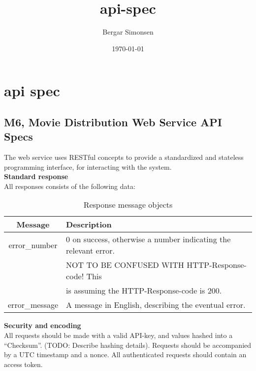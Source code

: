 \documentclass[11pt]{article}
\title{api-spec}
\author{Bergar Simonsen}
\date{\today}
\begin{document}
\maketitle

\setcounter{tocdepth}{3}
\tableofcontents
\vspace*{1cm}
\section{api spec}
\label{sec-1}
\subsection{M6, Movie Distribution Web Service API Specs}
\label{sec-1-1}

The web service uses RESTful concepts to provide a standardized and stateless programming interface, for interacting with the system. \\

\textbf{Standard response} \\
All responses consists of the following data:

\begin{table}[H]
\caption{Response message objects}
\begin{center}
\begin{tabular}{|c|l|}
\hline
 Message                     &  Description                                               \\
\hline
 error\_number   &  0 on success, otherwise a number indicating the relevant error.  \\
                             &  NOT TO BE CONFUSED WITH HTTP-Response-code! This   \\
                             &  is assuming the HTTP-Response-code is 200.                \\
\hline
 error\_message  &  A message in English, describing the eventual error.      \\
\hline
\end{tabular}
\end{center}
\end{table}



\textbf{Security and encoding} \\
All requests should be made with a valid API-key, and values hashed into a “Checksum”. (TODO: Describe hashing details). Requests should be accompanied by a UTC timestamp and a nonce. All authenticated requests should contain an access token.
\end{document}
